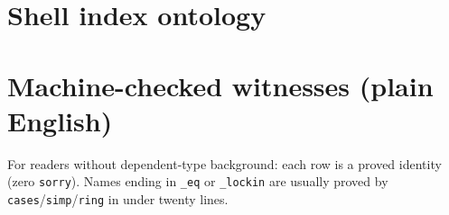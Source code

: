 \documentclass[11pt]{amsart}
\begin{document}
\section{Shell index ontology}
\label{app:shell-ontology}



\section{Machine-checked witnesses (plain English)}
\label{app:lean-witnesses}

For readers without dependent-type background: each row is a proved identity (zero \texttt{sorry}). Names ending in \texttt{\_eq} or \texttt{\_lockin} are usually proved by \texttt{cases}/\texttt{simp}/\texttt{ring} in under twenty lines.
\end{document}
